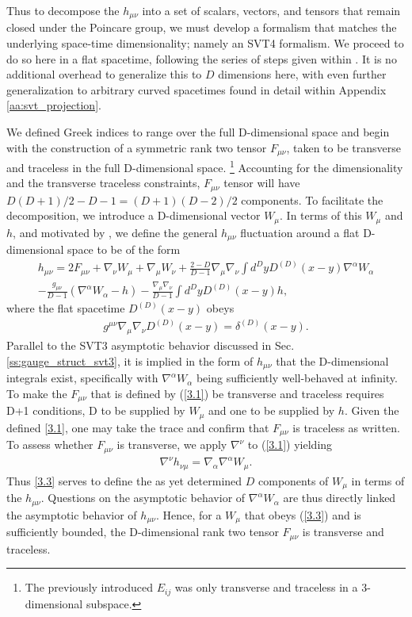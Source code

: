 Thus to decompose the $h_{\mu\nu}$ into a set of scalars, vectors, and tensors that remain closed under the Poincare group, we must develop a formalism that matches the underlying space-time dimensionality; namely an SVT4 formalism. We proceed to do so here in a flat spacetime, following the series of steps given within \cite{phelps_2019}. It is no additional overhead to generalize this to $D$ dimensions here, with even further generalization to arbitrary curved spacetimes found in detail within Appendix \ref{aa:svt_projection}.

We defined Greek indices to range over the full D-dimensional space and begin with the construction of a symmetric rank two tensor $F_{\mu\nu}$, taken to be transverse and traceless in the full D-dimensional space.
\footnote{The previously introduced $E_{ij}$ was only transverse and traceless in a 3-dimensional subspace.}
Accounting for the dimensionality and the transverse traceless constraints, $F_{\mu\nu}$ tensor will have $D(D+1)/2-D-1=(D+1)(D-2)/2$ components. To facilitate the decomposition, we introduce a D-dimensional  vector $W_{\mu}$. In terms of this $W_{\mu}$ and $h$, and motivated by \cite{mannheim_2005}, we define the general $h_{\mu\nu}$ fluctuation around a flat D-dimensional space to be of the form
%
\begin{eqnarray}
h_{\mu\nu}=2F_{\mu\nu}+\nabla_{\nu}W_{\mu}+\nabla_{\mu}W_{\nu}+\frac{2-D}{D-1}\nabla_{\mu}\nabla_{\nu}\int d^DyD^{(D)}(x-y)\nabla^{\alpha}W_{\alpha}
\nonumber\\
-\frac{g_{\mu\nu}}{D-1}(\nabla^{\alpha}W_{\alpha}-h)-\frac{\nabla_{\mu}\nabla_{\nu}}{D-1}\int d^DyD^{(D)}(x-y)h,
\label{3.1}
\end{eqnarray}
%
where the flat spacetime $D^{(D)}(x-y)$ obeys 
%
\begin{eqnarray}
g^{\mu\nu}\nabla_{\mu}\nabla_{\nu}D^{(D)}(x-y)=\delta^{(D)}(x-y).
\label{3.2}
\end{eqnarray}
%
Parallel to the SVT3 asymptotic behavior discussed in Sec. \ref{ss:gauge_struct_svt3}, it is implied in the form of $h_{\mu\nu}$ that the D-dimensional integrals exist, specifically with $\nabla^{\alpha}W_{\alpha}$ being sufficiently well-behaved at infinity.
To make the $F_{\mu\nu}$ that is defined by (\ref{3.1}) be transverse and traceless requires D+1 conditions, D to be supplied by $W_{\mu}$ and one  to be supplied by $h$. Given the defined \eqref{3.1}, one may take the trace and confirm that $F_{\mu\nu}$ is traceless as written. To assess whether $F_{\mu\nu}$ is transverse, we apply $\nabla^{\nu}$  to (\ref{3.1}) yielding
%
\begin{eqnarray}
\nabla^{\nu}h_{\nu\mu}=\nabla_{\alpha}\nabla^{\alpha}W_{\mu}.
\label{3.3}
\end{eqnarray}
% 
Thus \eqref{3.3} serves to define the as yet determined $D$ components of $W_\mu$ in terms of the $h_{\mu\nu}$. Questions on the asymptotic behavior of $\nabla^{\alpha}W_{\alpha}$ are thus directly linked the asymptotic behavior of $h_{\mu\nu}$. Hence, for a $W_{\mu}$ that obeys (\ref{3.3}) and is sufficiently bounded, the D-dimensional rank two tensor $F_{\mu\nu}$ is transverse and traceless.

